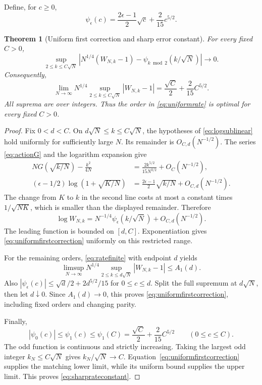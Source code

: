 \documentclass[11pt]{article}
\newtheorem{theorem}{Theorem}[section]
\theoremstyle{definition}
\theoremstyle{remark}
\newcommand{\1}{\mathbf 1}
\begin{document}
Define, for $c\ge0$,
\begin{equation}\label{eq:ratepsi}
\psi_\epsilon(c)=\frac{2\epsilon-1}{2}\sqrt c+\frac{2}{15}c^{5/2}.
\end{equation}

\begin{theorem}[Uniform first correction and sharp error constant]\label{thm:firstcorrection}
For every fixed $C>0$,
\begin{equation}\label{eq:uniformfirstcorrection}
\sup_{2\le k\le C\sqrt N}
\left|N^{1/4}(W_{N,k}-1)-\psi_{k\bmod2}(k/\sqrt N)\right|
\longrightarrow0.
\end{equation}
Consequently,
\begin{equation}\label{eq:sharprateconstant}
\lim_{N\to\infty}N^{1/4}
\sup_{2\le k\le C\sqrt N}|W_{N,k}-1|
=\frac{\sqrt C}{2}+\frac{2}{15}C^{5/2}.
\end{equation}
All suprema are over integers. Thus the order in \eqref{eq:uniformrate} is optimal for every fixed $C>0$.
\end{theorem}
\begin{proof}
Fix $0<d<C$. On $d\sqrt N\le k\le C\sqrt N$, the hypotheses of \eqref{eq:logsublinear} hold uniformly for sufficiently large $N$. Its remainder is $O_{C,d}(N^{-1/2})$. The series \eqref{eq:actionG} and the logarithm expansion give
\begin{align*}
NG(\sqrt{k/N})-\frac{k^2}{4N}
&=\frac{2k^{5/2}}{15N^{3/2}}+O_C(N^{-1/2}),\\
(\epsilon-1/2)\log(1+\sqrt{K/N})
&=\frac{2\epsilon-1}{2}\sqrt{k/N}+O_{C,d}(N^{-1/2}).
\end{align*}
The change from $K$ to $k$ in the second line costs at most a constant times $1/\sqrt{NK}$, which is smaller than the displayed remainder. Therefore
\[
\log W_{N,k}
=N^{-1/4}\psi_\epsilon(k/\sqrt N)+O_{C,d}(N^{-1/2}).
\]
The leading function is bounded on $[d,C]$. Exponentiation gives \eqref{eq:uniformfirstcorrection} uniformly on this restricted range.

For the remaining orders, \eqref{eq:ratefinite} with endpoint $d$ yields
\[
\limsup_{N\to\infty}N^{1/4}
\sup_{2\le k\le d\sqrt N}|W_{N,k}-1|\le A_1(d).
\]
Also $|\psi_\epsilon(c)|\le\sqrt d/2+2d^{5/2}/15$ for $0\le c\le d$. Split the full supremum at $d\sqrt N$, then let $d\downarrow0$. Since $A_1(d)\to0$, this proves \eqref{eq:uniformfirstcorrection}, including fixed orders and changing parity.

Finally,
\[
|\psi_0(c)|\le\psi_1(c)\le\psi_1(C)
=\frac{\sqrt C}{2}+\frac{2}{15}C^{5/2}
\qquad(0\le c\le C).
\]
The odd function is continuous and strictly increasing. Taking the largest odd integer $k_N\le C\sqrt N$ gives $k_N/\sqrt N\to C$. Equation~\eqref{eq:uniformfirstcorrection} supplies the matching lower limit, while its uniform bound supplies the upper limit. This proves \eqref{eq:sharprateconstant}.
\end{proof}
\end{document}
